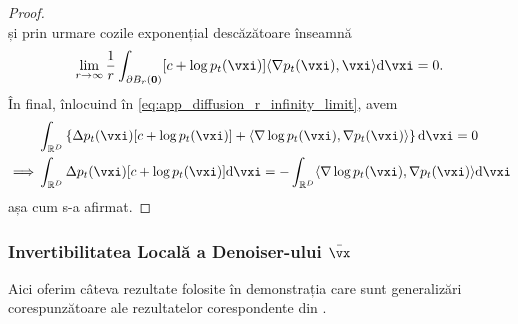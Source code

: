 \documentclass[../../book-main_ro.tex]{subfiles}
\begin{document}
\begin{proof}
\begin{equation}
    \end{equation}
    și prin urmare cozile exponențial descăzătoare înseamnă
    \begin{equation}
        \lim_{r \to \infty}\frac{1}{r}\int_{\partial B_{r}(\vzero)}[c + \log p_{t}(\vxi)]\ip{\nabla p_{t}(\vxi)}{\vxi}\odif{\vxi} = 0.
    \end{equation}
    În final, înlocuind în \eqref{eq:app_diffusion_r_infinity_limit}, avem
    \begin{align}
        &\int_{\R^{D}}\bc{\Delta p_{t}(\vxi)[c + \log p_{t}(\vxi)] + \ip{\nabla \log p_{t}(\vxi)}{\nabla p_{t}(\vxi)}}\odif{\vxi} = 0 \\
        \implies 
        &\int_{\R^{D}}\Delta p_{t}(\vxi)[c + \log p_{t}(\vxi)]\odif{\vxi} = -\int_{\R^{D}}\ip{\nabla \log p_{t}(\vxi)}{\nabla p_{t}(\vxi)}\odif{\vxi}
    \end{align}
    așa cum s-a afirmat.
\end{proof}

\subsubsection{Invertibilitatea Locală a Denoiser-ului \(\bar{\vx}\)}

Aici oferim câteva rezultate folosite în demonstrația  care sunt generalizări corespunzătoare ale rezultatelor corespondente din \cite{Gribonval2011-pf}.
\end{document}
